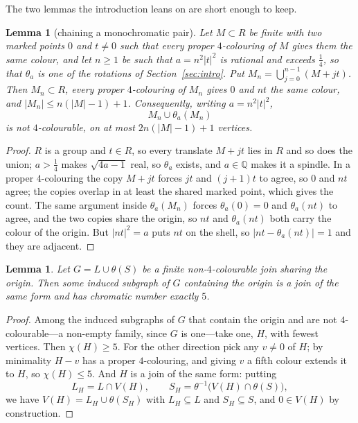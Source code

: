 \documentclass[11pt,reqno]{amsart}
\theoremstyle{plain}
\newtheorem{lemma}[theorem]{Lemma}
\theoremstyle{definition}
\newcommand{\Q}{\mathbb{Q}}
\newcommand{\Lat}{R}
\begin{document}
The two lemmas the introduction leans on are short enough to keep.

\begin{lemma}[chaining a monochromatic pair]\label{lem:chain}
Let $M \subset \Lat$ be finite with two marked points $0$ and $t \ne 0$ such that
every proper $4$-colouring of $M$ gives them the same colour, and let $n \ge 1$ be
such that $a = n^2\lvert t\rvert^2$ is rational and exceeds $\tfrac14$, so that
$\theta_a$ is one of the rotations of Section~\ref{sec:intro}. Put
$M_n = \bigcup_{j=0}^{n-1}(M + jt)$. Then $M_n \subset \Lat$, every proper
$4$-colouring of $M_n$ gives $0$ and $nt$ the same colour, and
$\lvert M_n \rvert \le n(\lvert M \rvert - 1) + 1$. Consequently, writing
$a = n^2\lvert t \rvert^2$,
\[
  M_n \cup \theta_a(M_n)
\]
is not $4$-colourable, on at most $2n(\lvert M \rvert - 1) + 1$ vertices.
\end{lemma}

\begin{proof}
$\Lat$ is a group and $t \in \Lat$, so every translate $M + jt$ lies in $\Lat$ and
so does the union; $a > \tfrac14$ makes $\sqrt{4a-1}$ real, so $\theta_a$ exists,
and $a \in \Q$ makes it a spindle. In a proper $4$-colouring the copy $M + jt$
forces $jt$ and
$(j+1)t$ to agree, so $0$ and $nt$ agree; the copies overlap in at least the
shared marked point, which gives the count. The same argument inside
$\theta_a(M_n)$ forces $\theta_a(0) = 0$ and $\theta_a(nt)$ to agree, and the two
copies share the origin, so $nt$ and $\theta_a(nt)$ both carry the colour of the
origin. But $\lvert nt \rvert^2 = a$ puts $nt$ on the shell, so
$\lvert nt - \theta_a(nt) \rvert = 1$ and they are adjacent.
\end{proof}

\begin{lemma}\label{lem:subjoin}
Let $G = L \cup \theta(S)$ be a finite non-$4$-colourable join sharing the origin.
Then some induced subgraph of $G$ containing the origin is a join of the same
form and has chromatic number exactly $5$.
\end{lemma}

\begin{proof}
Among the induced subgraphs of $G$ that contain the origin and are not
$4$-colourable---a non-empty family, since $G$ is one---take one, $H$, with
fewest vertices. Then $\chi(H) \ge 5$. For the other direction pick any
$v \ne 0$ of $H$; by minimality $H - v$ has a proper $4$-colouring, and giving
$v$ a fifth colour extends it to $H$, so $\chi(H) \le 5$. And $H$ is a join of the
same form: putting
\[
  L_H = L \cap V(H), \qquad S_H = \theta^{-1}\bigl(V(H) \cap \theta(S)\bigr),
\]
we have $V(H) = L_H \cup \theta(S_H)$ with $L_H \subseteq L$ and
$S_H \subseteq S$, and $0 \in V(H)$ by construction.
\end{proof}
\end{document}
